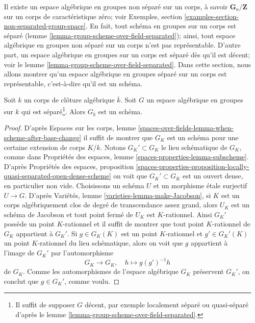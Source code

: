 \noindent
Il existe un espace algébrique en groupes non séparé sur un corps,
à savoir $\mathbf{G}_a/\mathbf{Z}$ sur un corps de caractéristique zéro; voir
Exemples, section \ref{examples-section-non-separated-group-space}.
En fait, tout schéma en groupes sur un corps est séparé
(lemme \ref{lemma-group-scheme-over-field-separated});
ainsi, tout espace algébrique en groupes non séparé sur un corps
n'est pas représentable. D'autre part, un espace algébrique en
groupes sur un corps est séparé dès qu'il est décent; voir le
lemme \ref{lemma-group-scheme-over-field-separated}.
Dans cette section, nous allons montrer qu'un
espace algébrique en groupes séparé sur un corps
est représentable, c'est-à-dire qu'il est un schéma.

\begin{lemma}
\label{lemma-group-space-scheme-over-kbar}
Soit $k$ un corps de clôture algébrique $\overline{k}$.
Soit $G$ un espace algébrique en groupes sur $k$
qui est séparé\footnote{Il suffit de supposer $G$ décent,
par exemple localement séparé ou quasi-séparé d'après le
lemme \ref{lemma-group-scheme-over-field-separated}.}.
Alors $G_{\overline{k}}$ est un schéma.
\end{lemma}

\begin{proof}
D'après Espaces sur les corps, lemme
\ref{spaces-over-fields-lemma-when-scheme-after-base-change}
il suffit de montrer que $G_K$ est un schéma pour une certaine extension de corps
$K/k$. Notons $G_K' \subset G_K$ le lieu schématique
de $G_K$, comme dans Propriétés des espaces, lemme
\ref{spaces-properties-lemma-subscheme}.
D'après Propriétés des espaces, proposition
\ref{spaces-properties-proposition-locally-quasi-separated-open-dense-scheme}
on voit que $G_K' \subset G_K$ est un ouvert dense, en particulier non vide.
Choisissons un schéma $U$ et un morphisme étale surjectif $U \to G$. D'après
Variétés, lemme \ref{varieties-lemma-make-Jacobson},
si $K$ est un corps algébriquement clos de degré de transcendance assez
grand, alors $U_K$ est un schéma de Jacobson et
tout point fermé de $U_K$ est $K$-rationnel.
Ainsi $G_K'$ possède un point $K$-rationnel et il suffit
de montrer que tout point $K$-rationnel de $G_K$ appartient à $G_K'$.
Si $g \in G_K(K)$ est un point $K$-rationnel et $g' \in G_K'(K)$
un point $K$-rationnel du lieu schématique, alors on voit que
$g$ appartient à l'image de $G_K'$ par l'automorphisme
$$
G_K \longrightarrow G_K,\quad
h \longmapsto g(g')^{-1}h
$$
de $G_K$. Comme les automorphismes de l'espace algébrique $G_K$ préservent
$G_K'$, on conclut que $g \in G_K'$, comme voulu.
\end{proof}

